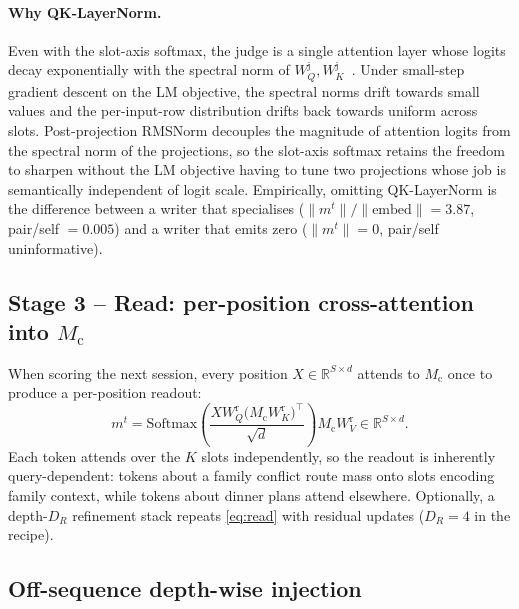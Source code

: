 \documentclass[11pt]{article}
\newcommand{\Mc}{M_{\mathrm{c}}}
\newcommand{\mt}{m^t}
\begin{document}
\paragraph{Why QK-LayerNorm.}
Even with the slot-axis softmax, the judge is a single attention
layer whose logits decay exponentially with the spectral norm of
$W_Q^{\mathrm{j}}, W_K^{\mathrm{j}}$~\citep{zhai2023sigmareparam}.
Under small-step gradient descent on the LM objective, the spectral
norms drift towards small values and the per-input-row distribution
drifts back towards uniform across slots. Post-projection RMSNorm
decouples the magnitude of attention logits from the spectral norm
of the projections, so the slot-axis softmax retains the freedom to
sharpen without the LM objective having to tune two projections whose
job is semantically independent of logit scale. Empirically, omitting
QK-LayerNorm is the difference between a writer that specialises
($\|\mt\|/\|\mathrm{embed}\| = 3.87$, pair/self $= 0.005$) and a
writer that emits zero ($\|\mt\| = 0$, pair/self uninformative).

\subsection{Stage 3 -- Read: per-position cross-attention into \texorpdfstring{$\Mc$}{Mc}}

When scoring the next session, every position $X \in \mathbb{R}^{S \times d}$
attends to $\Mc$ once to produce a per-position readout:
\begin{equation}
\mt = \mathrm{Softmax}\!\left(
  \frac{X W_Q^{\mathrm{r}} \bigl(\Mc W_K^{\mathrm{r}}\bigr)^\top}{\sqrt{d}}
  \right) \Mc W_V^{\mathrm{r}} \in \mathbb{R}^{S \times d}.
\label{eq:read}
\end{equation}
Each token attends over the $K$ slots independently, so the readout is
inherently query-dependent: tokens about a family conflict route mass
onto slots encoding family context, while tokens about dinner plans
attend elsewhere. Optionally, a depth-$D_R$ refinement stack repeats
\eqref{eq:read} with residual updates ($D_R = 4$ in the recipe).

\subsection{Off-sequence depth-wise injection}
\label{sec:routing}
\end{document}
